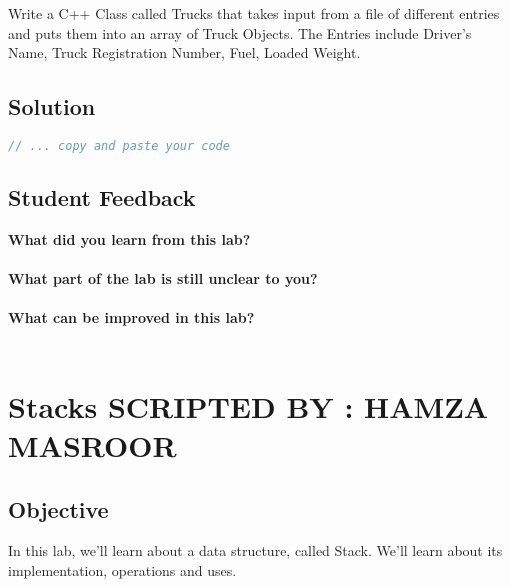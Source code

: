\documentclass[11pt,fleqn]{book} %
\begin{document}
\begin{problem} Write a C++ Class called Trucks that takes input from a file of different entries and puts them into an array of Truck Objects. The Entries include Driver's Name, Truck Registration Number, Fuel, Loaded Weight.
\end{problem}

\newpage
\section{Solution}
\begin{lstlisting}[language=C++]
  // ... copy and paste your code
\end{lstlisting}

\newpage
\section{Student Feedback}
\textbf{What did you learn from this lab?}\\
\noindent\fbox{\parbox{\textwidth}{
  }
}\\
\textbf{What part of the lab is still unclear to you?}\\
\noindent\fbox{\parbox{\textwidth}{
  }
}\\
\textbf{What can be improved in this lab?}\\ 
\noindent\fbox{\parbox{\textwidth}{
  }
}\\

\newpage
{} %
\chapter{Stacks \hspace{76mm} {\textsc{\small SCRIPTED BY : HAMZA MASROOR}}}
\section{Objective}
In this lab, we'll learn about a data structure, called Stack. We'll learn about its implementation, operations and uses.
\end{document}
